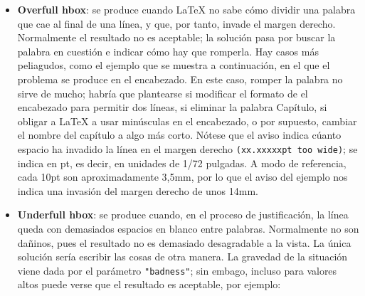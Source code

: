 \begin{itemize}
	\begin{itemize}

	\item  \textbf{Overfull hbox}:
	se produce cuando LaTeX no sabe cómo dividir una palabra que cae al final de una línea, y que, por tanto, invade el margen derecho. Normalmente el resultado no es aceptable; la solución pasa por buscar la palabra en cuestión e indicar cómo hay que romperla. Hay casos más peliagudos, como el ejemplo que se muestra a continuación, en el que el problema se produce en el encabezado. En este caso, romper la palabra no sirve de mucho; habría que plantearse si modificar el formato de el encabezado para permitir dos líneas, si eliminar la palabra Capítulo, si obligar a LaTeX a usar minúsculas en el encabezado, o por supuesto, cambiar el nombre del capítulo a algo más corto. Nótese que el aviso indica cúanto espacio ha invadido la línea en el margen derecho \verb|(xx.xxxxxpt too wide)|; se indica en pt, es decir, en unidades de 1/72 pulgadas. A modo de referencia, cada 10pt son aproximadamente 3,5mm, por lo que el aviso del ejemplo nos indica una invasión del margen derecho de unos 14mm.
	\begin{figure}[h]
 	\begin{fblock}
  	\color{red}{
  	\begin{verbatim}
	 Overfull \hbox (39.74638pt too wide) has occurred while 
	\output is active
  	\end{verbatim}
	}
 	\end{fblock}
	
	\end{figure}


	\item  \textbf{Underfull hbox}:
	se produce cuando, en el proceso de justificación, la línea queda con demasiados espacios en blanco entre palabras. Normalmente no son dañinos, pues el resultado no es demasiado desagradable a la vista. La única solución sería escribir las cosas de otra manera. La gravedad de la situación viene dada por el parámetro \verb|"badness"|; sin embago, incluso para valores altos puede verse que el resultado es aceptable, por ejemplo:
	\begin{figure}[h]
 	\begin{fblock}
  	\color{red}{
  	\begin{verbatim}
	Underfull \hbox (badness 10000) in paragraph
	at lines 1398-1399
  	\end{verbatim}
	}
 	\end{fblock}
	

\end{figure}
\end{itemize}
\end{itemize}

